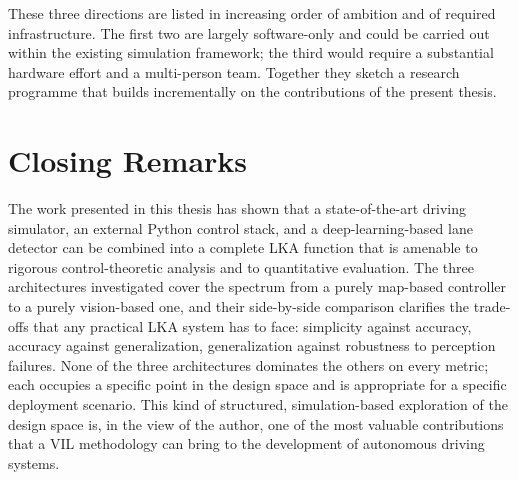 These three directions are listed in increasing order of ambition and of required infrastructure. The first two are largely software-only and could be carried out within the existing simulation framework; the third would require a substantial hardware effort and a multi-person team. Together they sketch a research programme that builds incrementally on the contributions of the present thesis.

\section{Closing Remarks}
The work presented in this thesis has shown that a state-of-the-art driving simulator, an external Python control stack, and a deep-learning-based lane detector can be combined into a complete \ac{LKA} function that is amenable to rigorous control-theoretic analysis and to quantitative evaluation. The three architectures investigated cover the spectrum from a purely map-based controller to a purely vision-based one, and their side-by-side comparison clarifies the trade-offs that any practical \ac{LKA} system has to face: simplicity against accuracy, accuracy against generalization, generalization against robustness to perception failures. None of the three architectures dominates the others on every metric; each occupies a specific point in the design space and is appropriate for a specific deployment scenario. This kind of structured, simulation-based exploration of the design space is, in the view of the author, one of the most valuable contributions that a \ac{VIL} methodology can bring to the development of autonomous driving systems.
